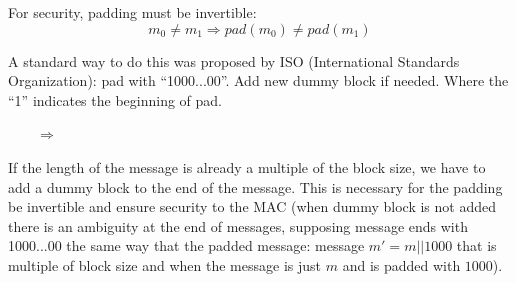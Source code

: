\documentclass[12pt]{book}
\begin{document}
For security, padding must be invertible:
$$m_{0}\neq m_{1} \Rightarrow pad(m_{0})\neq pad(m_{1})$$

A standard way to do this was proposed by ISO (International Standards Organization): pad with ``1000...00''. Add new dummy block if needed. Where the ``1'' indicates the beginning of pad.
\begin{center}
	\ \ \ \ $\Longrightarrow$\ \ \ \ 
\end{center}If the length of the message is already a multiple of the block size, we have to add a dummy block to the end of the message. This is necessary for the padding be invertible and ensure security to the MAC (when dummy block is not added there is an ambiguity at the end of messages, supposing message ends with 1000...00 the same way that the padded message: message $m'=m||1000$ that is multiple of block size and when the message is just $m$ and is padded with $1000$).
\end{document}
